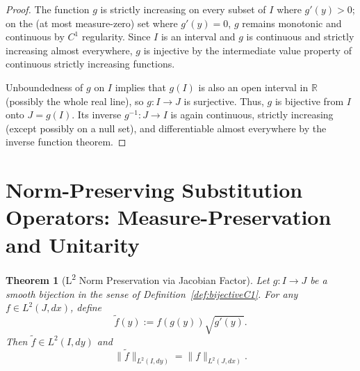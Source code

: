\documentclass[12pt]{article}
\newtheorem{theorem}{Theorem}[section]
\begin{document}
\begin{proof}
The function $g$ is strictly increasing on every subset of $I$ where $g'(y) > 0$; on the (at most measure-zero) set where $g'(y) = 0$, $g$ remains monotonic and continuous by $C^1$ regularity. Since $I$ is an interval and $g$ is continuous and strictly increasing almost everywhere, $g$ is injective by the intermediate value property of continuous strictly increasing functions.

Unboundedness of $g$ on $I$ implies that $g(I)$ is also an open interval in $\mathbb{R}$ (possibly the whole real line), so $g: I \to J$ is surjective. Thus, $g$ is bijective from $I$ onto $J = g(I)$. Its inverse $g^{-1}: J \to I$ is again continuous, strictly increasing (except possibly on a null set), and differentiable almost everywhere by the inverse function theorem.
\end{proof}

\section{Norm-Preserving Substitution Operators: Measure-Preservation and Unitarity}

\begin{theorem}[L\textsuperscript{2} Norm Preservation via Jacobian Factor]\label{thm:L2_jacobian}
Let $g: I \to J$ be a smooth bijection in the sense of Definition~\ref{def:bijectiveC1}. For any $f \in L^2(J,dx)$, define
\begin{equation}\label{eq:transformationdef}
    \widetilde{f}(y) := f(g(y)) \sqrt{g'(y)}.
\end{equation}
Then $\widetilde{f} \in L^2(I, dy)$ and
\begin{equation}\label{eq:L2normpres}
    \| \widetilde{f} \|_{L^2(I, dy)} = \| f \|_{L^2(J, dx)}.
\end{equation}
\end{theorem}
\end{document}
